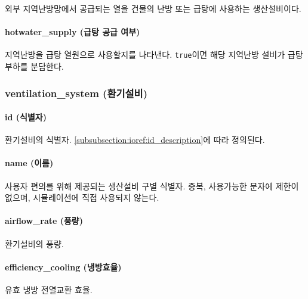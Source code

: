 외부 지역난방망에서 공급되는 열을 건물의 난방 또는 급탕에 사용하는 생산설비이다.


\paragraph{hotwater\_supply (급탕 공급 여부)} 지역난방을 급탕 열원으로 사용할지를 나타낸다. \texttt{true}이면 해당 지역난방 설비가 급탕 부하를 분담한다.

\subsubsection{ventilation\_system (환기설비)} \label{subsubsection:ioref:ventilationsystem}


\paragraph{id (식별자)} 환기설비의 식별자. \ref{subsubsection:ioref:id_description}에 따라 정의된다.

\paragraph{name (이름)} 사용자 편의를 위해 제공되는 생산설비 구별 식별자. 중복, 사용가능한 문자에 제한이 없으며, 시뮬레이션에 직접 사용되지 않는다.

\paragraph{airflow\_rate (풍량)} 환기설비의 풍량.

\paragraph{efficiency\_cooling (냉방효율)} 유효 냉방 전열교환 효율.

